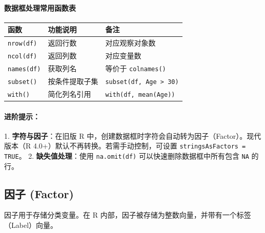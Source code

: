 \paragraph{数据框处理常用函数表}
\begin{table}[h]
\centering
\renewcommand{\arraystretch}{1.5}
\begin{tabular}{|l|l|l|}
\hline
\textbf{函数} & \textbf{功能说明} & \textbf{备注} \\ \hline
\texttt{nrow(df)} & 返回行数 & 对应观察对象数 \\ \hline
\texttt{ncol(df)} & 返回列数 & 对应变量数 \\ \hline
\texttt{names(df)} & 获取列名 & 等价于 \texttt{colnames()} \\ \hline
\texttt{subset()} & 按条件提取子集 & \texttt{subset(df, Age > 30)} \\ \hline
\texttt{with()} & 简化列名引用 & \texttt{with(df, mean(Age))} \\ \hline
\end{tabular}
\end{table}

\paragraph{进阶提示：}
1. \textbf{字符与因子}：在旧版 R 中，创建数据框时字符会自动转为因子（Factor）。现代版本（R 4.0+）默认不再转换。若需手动控制，可设置 \texttt{stringsAsFactors = TRUE}。
2. \textbf{缺失值处理}：使用 \texttt{na.omit(df)} 可以快速删除数据框中所有包含 \texttt{NA} 的行。



\subsection{因子 (Factor)}

因子用于存储分类变量。在 R 内部，因子被存储为整数向量，并带有一个标签（Label）向量。

